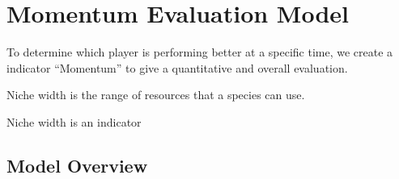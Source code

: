 \section{Momentum Evaluation Model}

To determine which player is performing better at a specific time, we create a indicator ``Momentum'' 
to give a quantitative and overall evaluation.

\begin{definition}
    Niche width is the range of resources that a species can use.
\end{definition}
Niche width is an indicator \cite{Alice13}

\subsection{Model Overview}

